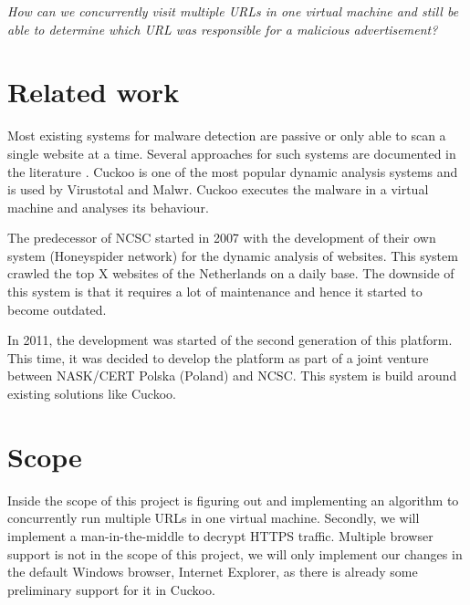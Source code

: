 \documentclass{scrartcl}
\begin{document}
\textit{How can we concurrently visit multiple URLs in one virtual machine and still be able to determine which URL was responsible for a malicious advertisement?}

\section{Related work}

Most existing systems for malware detection are passive or only able to scan a single website at a time. Several approaches for such systems are documented in the literature \cite{auto_malware}. Cuckoo \cite{cuckoo} is one of the most popular dynamic analysis systems and is used by Virustotal and Malwr. Cuckoo executes the malware in a virtual machine and analyses its behaviour.

The predecessor of NCSC started in 2007 with the development of their own system (Honeyspider network) for the dynamic analysis of websites. This system crawled the top X websites of the Netherlands on a daily base. The downside of this system is that it requires a lot of maintenance and hence it started to become outdated.

In 2011, the development was started of the second generation of this platform. This time, it was decided to develop the platform as part of a joint venture between NASK/CERT Polska (Poland) and NCSC. This system is build around existing solutions like Cuckoo.

\section{Scope}

Inside the scope of this project is figuring out and implementing an algorithm to concurrently run multiple URLs in one virtual machine. Secondly, we will implement a man-in-the-middle to decrypt HTTPS traffic. Multiple browser support is not in the scope of this project, we will only implement our changes in the default Windows browser, Internet Explorer, as there is already some preliminary support for it in Cuckoo.


\end{document}

